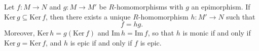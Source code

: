 Let $f: M \to N$ and $g: M \to M'$ be $R$-homomorphisms with $g$ an epimorphism. If $\text{Ker}\, g \subseteq \text{Ker}\, f$, then there exists a unique $R$-homomorphism $h: M' \to N$ such that
$$f = hg.$$
Moreover, $\text{Ker}\, h = g(\text{Ker}\, f)$ and $\text{Im}\, h = \text{Im}\, f$, so that $h$ is monic if and only if $\text{Ker}\, g = \text{Ker}\, f$, and $h$ is epic if and only if $f$ is epic.
